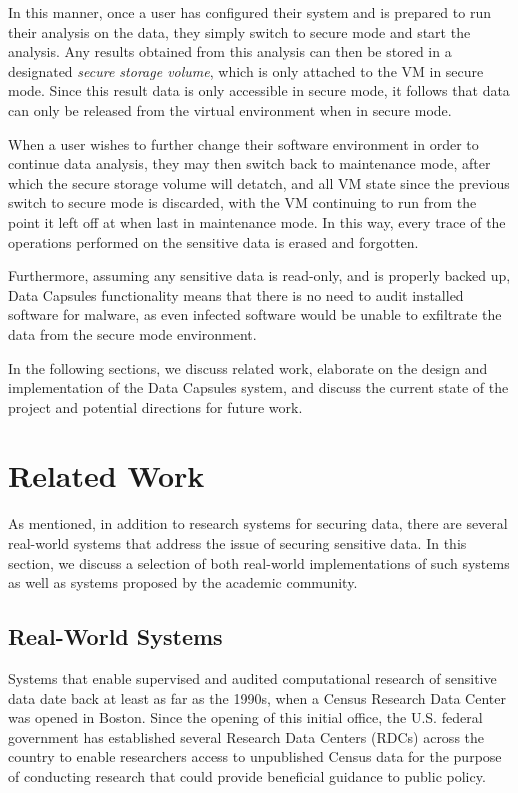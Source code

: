 \documentclass{acm_proc_article-sp}
\begin{document}
In this manner, once a user has configured their system and is prepared to
run their analysis on the data, they simply switch to secure mode and start
the analysis.  Any results obtained from this analysis can then be stored in a
designated \emph{secure storage volume}, which is only attached to the VM in
secure mode.  Since this result data is only accessible in secure mode, it
follows that data can only be released from the virtual environment when in
secure mode.

When a user wishes to further change their software environment in order to
continue data analysis, they may then switch back to maintenance mode, after
which the secure storage volume will detatch, and all VM state since the
previous switch to secure mode is discarded, with the VM continuing to run from
the point it left off at when last in maintenance mode.  In this way, every
trace of the operations performed on the sensitive data is erased and forgotten.

Furthermore, assuming any sensitive data is read-only, and is properly backed
up, Data Capsules functionality means that there is no need to audit installed
software for malware, as even infected software would be unable to exfiltrate
the data from the secure mode environment.

In the following sections, we discuss related work, elaborate on the design and
implementation of the Data Capsules system, and discuss the current state of
the project and potential directions for future work.

\section{Related Work}

As mentioned, in addition to research systems for securing data, there are
several real-world systems that address the issue of securing sensitive data.
In this section, we discuss a selection of both real-world implementations of
such systems as well as systems proposed by the academic community.

\subsection{Real-World Systems}

Systems that enable supervised and audited computational research of sensitive
data date back at least as far as the 1990s, when a Census Research Data Center
was opened in Boston.  Since the opening of this initial office, the U.S.
federal government has established several Research Data Centers (RDCs) across
the country to enable researchers access to unpublished Census data for the
purpose of conducting research that could provide beneficial guidance to public
policy.
\end{document}
